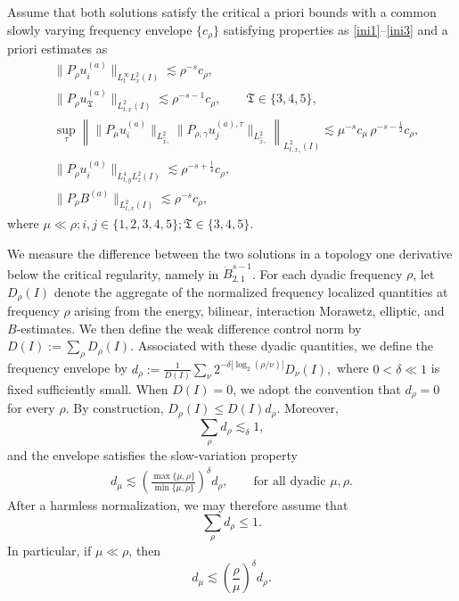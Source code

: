 \documentclass[11pt,letterpaper,reqno]{amsart}
\numberwithin{equation}{section}
\theoremstyle{definition}
\theoremstyle{remark}
\begin{document}
Assume that both solutions satisfy the critical a priori bounds with a common
slowly varying frequency envelope \(\{c_\rho\}\) satisfying properties as \eqref{ini1}--\eqref{ini3} and a priori estimates as
\begin{align}
 & \|P_\rho u_i^{(a)}\|_{L^\infty_tL^2_x(I)}
\lesssim
\rho^{-s}c_\rho,
 \label{Ea1}\tag{Ea1}
\\
&\|P_\rho u_{\mathfrak T}^{(a)}\|_{L^2_{t,x}(I)}
\lesssim
\rho^{-s-1}c_\rho,\qquad \mathfrak{T}\in\{3,4,5\}, \label{Ea2}
\tag{Ea2}
\\
&\sup_\tau
\left\|
\|P_\mu u_i^{(a)}\|_{L^2_{\widehat x_\gamma}}
\|P_{\rho,\gamma}u_j^{(a),\tau}\|_{L^2_{\widehat x_\gamma}}
\right\|_{L^2_{t,x_\gamma}(I)}
\lesssim
\mu^{-s}c_\mu\,\rho^{-s-\frac12}c_\rho, \label{Ea3}
\tag{Ea3}
\\
&\|P_\rho u_i^{(a)}\|_{L^4_{t,y}L^2_z(I)}
\lesssim
\rho^{-s+\frac14}c_\rho, \label{Ea4}
\tag{Ea4}   \\
&\|P_\rho B^{(a)}\|_{L^2_{t,x}(I)}
\lesssim
\rho^{-s}c_\rho,  \label{Ea5}
\tag{Ea5}
\end{align}
 where \(\mu\ll\rho; i,j\in\{1,2,3,4,5\};  \mathfrak{T}\in\{3,4,5\}\).


 We measure the difference between the two solutions in a topology one
derivative below the critical regularity, namely in
\(\dot B^{s-1}_{2,1}\). For each dyadic frequency \(\rho\), let
\(D_\rho(I)\) denote the aggregate of the normalized frequency localized
quantities at frequency \(\rho\) arising from the energy, bilinear,
interaction Morawetz, elliptic, and \(B\)-estimates. We then define
the weak difference control norm by
\(
D(I):=\sum_\rho D_\rho(I).
\)
Associated with these dyadic quantities, we define the frequency envelope
by
\(
d_\rho
:=
\frac{1}{D(I)}
\sum_\nu
2^{-\delta\left|\log_2(\rho/\nu)\right|}
D_\nu(I),
\)
where \(0<\delta\ll1\) is fixed sufficiently small. When \(D(I)=0\), we
adopt the convention that \(d_\rho=0\) for every \(\rho\). By construction,
\(
D_\rho(I)\leq D(I)d_\rho.
\)
Moreover,
\[
\sum_\rho d_\rho\lesssim_\delta 1,
\]
and the envelope satisfies the slow-variation property
\begin{align}
d_\mu
\lesssim
\left(
\frac{\max\{\mu,\rho\}}{\min\{\mu,\rho\}}
\right)^\delta
d_\rho,
\qquad
\text{for all dyadic }\mu,\rho.
\label{slow.inva.d}
\end{align}
After a harmless normalization, we may therefore assume that
\[
\sum_\rho d_\rho\leq1.
\]
In particular, if \(\mu\ll\rho\), then
\[
d_\mu
\lesssim
\left(\frac{\rho}{\mu}\right)^\delta d_\rho.
\]
\end{document}
